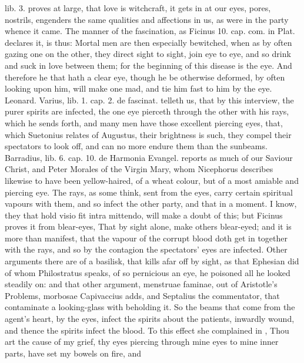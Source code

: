 \Heliodorus lib. 3. proves at large, that love is witchcraft, it
gets in at our eyes, pores, nostrils, engenders the same qualities and
affections in us, as were in the party whence it came. The manner of
the fascination, as Ficinus 10. cap. com. in Plat. declares it, is
thus: Mortal men are then especially bewitched, when as by often gazing
one on the other, they direct sight to sight, join eye to eye, and so
drink and suck in love between them; for the beginning of this disease
is the eye. And therefore he that hath a clear eye, though he be
otherwise deformed, by often looking upon him, will make one mad, and
tie him fast to him by the eye. Leonard. Varius, lib. 1. cap. 2. de
fascinat. telleth us, that by this interview, the purer spirits
are infected, the one eye pierceth through the other with his rays,
which he sends forth, and many men have those excellent piercing eyes,
that, which Suetonius relates of Augustus, their brightness is such,
they compel their spectators to look off, and can no more endure them
than the sunbeams. Barradius, lib. 6. cap. 10. de Harmonia
Evangel. reports as much of our Saviour Christ, and Peter Morales
of the Virgin Mary, whom Nicephorus describes likewise to have been
yellow-haired, of a wheat colour, but of a most amiable and piercing
eye. The rays, as some think, sent from the eyes, carry certain
spiritual vapours with them, and so infect the other party, and that in
a moment. I know, they that hold visio fit intra mittendo, will make a
doubt of this; but Ficinus proves it from blear-eyes,  That by
sight alone, make others blear-eyed; and it is more than manifest, that
the vapour of the corrupt blood doth get in together with the rays, and
so by the contagion the spectators' eyes are infected. Other arguments
there are of a basilisk, that kills afar off by sight, as that Ephesian
did of whom Philostratus speaks, of so pernicious an eye, he
poisoned all he looked steadily on: and that other argument, menstruae
faminae, out of Aristotle's Problems, morbosae Capivaccius adds, and
Septalius the commentator, that contaminate a looking-glass with
beholding it.  So the beams that come from the agent's heart, by
the eyes, infect the spirits about the patients, inwardly wound, and
thence the spirits infect the blood. To this effect she complained in
\Apuleius, Thou art the cause of my grief, thy eyes piercing
through mine eyes to mine inner parts, have set my bowels on fire, and
